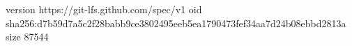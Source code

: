 version https://git-lfs.github.com/spec/v1
oid sha256:d7b59d7a5c2f28babb9ce3802495eeb5ea1790473fef34aa7d24b08ebbd2813a
size 87544
